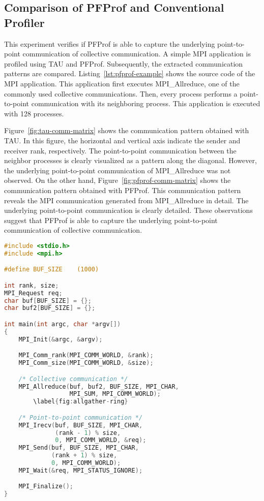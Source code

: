 \subsection{Comparison of PFProf and Conventional Profiler}%
\label{sec:ii-eval-pfprof}

This experiment verifies if PFProf is able to capture the underlying
point-to-point communication of collective communication. A simple
MPI application is profiled using TAU and PFProf. Subsequently, the extracted
communication patterns are compared. Listing~\ref{lst:pfprof-example} shows
the source code of the MPI application. This application first executes
MPI\_Allreduce, one of the commonly used collective communications. Then,
every process performs a point-to-point communication with its neighboring
process. This application is executed with 128 processes.

Figure~\ref{fig:tau-comm-matrix} shows the communication pattern obtained with
TAU\@. In this figure, the horizontal and vertical axis indicate the sender and
receiver rank, respectively. The point-to-point communication between the
neighbor processes is clearly visualized as a pattern along the diagonal.
However, the underlying point-to-point communication of MPI\_Allreduce was not
observed. On the other hand, Figure~\ref{fig:pfprof-comm-matrix} shows the
communication pattern obtained with PFProf. This communication pattern reveals
the MPI communication generated from MPI\_Allreduce in detail. The underlying
point-to-point communication is clearly detailed. These observations suggest
that PFProf is able to capture the underlying point-to-point communication of
collective communication.

\begin{lstlisting}[caption={MPI Application Used for Evaluation},
                   label=lst:pfprof-example, float, language=C]
#include <stdio.h>
#include <mpi.h>

#define BUF_SIZE    (1000)

int rank, size;
MPI_Request req;
char buf[BUF_SIZE] = {};
char buf2[BUF_SIZE] = {};

int main(int argc, char *argv[])
{
    MPI_Init(&argc, &argv);

    MPI_Comm_rank(MPI_COMM_WORLD, &rank);
    MPI_Comm_size(MPI_COMM_WORLD, &size);

    /* Collective communication */
    MPI_Allreduce(buf, buf2, BUF_SIZE, MPI_CHAR,
                  MPI_SUM, MPI_COMM_WORLD);
        \label{fig:allgather-ring}

    /* Point-to-point communication */
    MPI_Irecv(buf, BUF_SIZE, MPI_CHAR,
              (rank - 1) % size,
              0, MPI_COMM_WORLD, &req);
    MPI_Send(buf, BUF_SIZE, MPI_CHAR,
             (rank + 1) % size,
             0, MPI_COMM_WORLD);
    MPI_Wait(&req, MPI_STATUS_IGNORE);

    MPI_Finalize();
}
\end{lstlisting}

